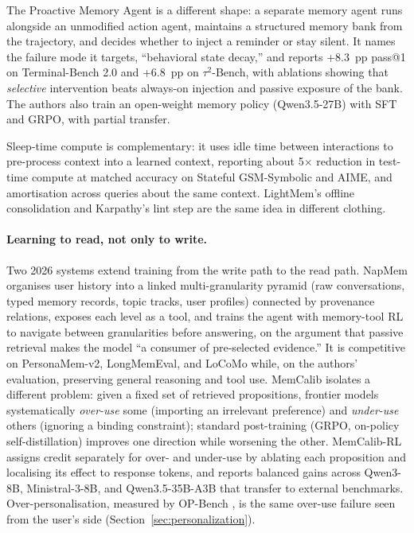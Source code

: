 \documentclass[11pt]{article}
\begin{document}
The Proactive Memory Agent \citep{wu2026proactive} is a different shape: a separate memory agent runs alongside an unmodified action agent, maintains a structured memory bank from the trajectory, and decides whether to inject a reminder or stay silent. It names the failure mode it targets, ``behavioral state decay,'' and reports +8.3~pp pass@1 on Terminal-Bench 2.0 and +6.8~pp on $\tau^2$-Bench, with ablations showing that \emph{selective} intervention beats always-on injection and passive exposure of the bank. The authors also train an open-weight memory policy (Qwen3.5-27B) with SFT and GRPO, with partial transfer.

Sleep-time compute \citep{lin2025sleeptime} is complementary: it uses idle time between interactions to pre-process context into a learned context, reporting about 5$\times$ reduction in test-time compute at matched accuracy on Stateful GSM-Symbolic and AIME, and amortisation across queries about the same context. LightMem's offline consolidation and Karpathy's lint step are the same idea in different clothing.

\paragraph{Learning to read, not only to write.} Two 2026 systems extend training from the write path to the read path. NapMem \citep{xu2026napmem} organises user history into a linked multi-granularity pyramid (raw conversations, typed memory records, topic tracks, user profiles) connected by provenance relations, exposes each level as a tool, and trains the agent with memory-tool RL to navigate between granularities before answering, on the argument that passive retrieval makes the model ``a consumer of pre-selected evidence.'' It is competitive on PersonaMem-v2, LongMemEval, and LoCoMo while, on the authors' evaluation, preserving general reasoning and tool use. MemCalib \citep{cao2026memcalib} isolates a different problem: given a fixed set of retrieved propositions, frontier models systematically \emph{over-use} some (importing an irrelevant preference) and \emph{under-use} others (ignoring a binding constraint); standard post-training (GRPO, on-policy self-distillation) improves one direction while worsening the other. MemCalib-RL assigns credit separately for over- and under-use by ablating each proposition and localising its effect to response tokens, and reports balanced gains across Qwen3-8B, Ministral-3-8B, and Qwen3.5-35B-A3B that transfer to external benchmarks. Over-personalisation, measured by OP-Bench \citep{hu2026opbench}, is the same over-use failure seen from the user's side (Section~\ref{sec:personalization}).
\end{document}
